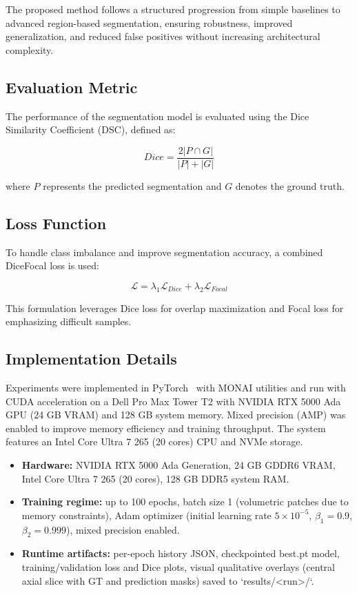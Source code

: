 \documentclass[conference]{IEEEtran}
\begin{document}
The proposed method follows a structured progression from simple baselines to advanced region-based segmentation, ensuring robustness, improved generalization, and reduced false positives without increasing architectural complexity.

\subsection{Evaluation Metric}

The performance of the segmentation model is evaluated using the Dice Similarity Coefficient (DSC), defined as:

\begin{equation}
Dice = \frac{2|P \cap G|}{|P| + |G|}
\end{equation}

where $P$ represents the predicted segmentation and $G$ denotes the ground truth.

\subsection{Loss Function}

To handle class imbalance and improve segmentation accuracy, a combined DiceFocal loss is used:

\begin{equation}
\mathcal{L} = \lambda_1 \mathcal{L}_{Dice} + \lambda_2 \mathcal{L}_{Focal}
\end{equation}

This formulation leverages Dice loss for overlap maximization and Focal loss for emphasizing difficult samples.

\subsection{Implementation Details}
Experiments were implemented in PyTorch~\cite{16} with MONAI utilities and run with CUDA acceleration on a Dell Pro Max Tower T2 with NVIDIA RTX 5000 Ada GPU (24 GB VRAM) and 128 GB system memory. Mixed precision (AMP) was enabled to improve memory efficiency and training throughput. The system features an Intel Core Ultra 7 265 (20 cores) CPU and NVMe storage.
\begin{itemize}
\item \textbf{Hardware:} NVIDIA RTX 5000 Ada Generation, 24 GB GDDR6 VRAM, Intel Core Ultra 7 265 (20 cores), 128 GB DDR5 system RAM.
\item \textbf{Training regime:} up to 100 epochs, batch size 1 (volumetric patches due to memory constraints), Adam optimizer (initial learning rate $5\times10^{-5}$, $\beta_1=0.9$, $\beta_2=0.999$), mixed precision enabled.
\item \textbf{Runtime artifacts:} per-epoch history JSON, checkpointed best.pt model, training/validation loss and Dice plots, visual qualitative overlays (central axial slice with GT and prediction masks) saved to `results/<run>/`.
\end{itemize}
\end{document}
